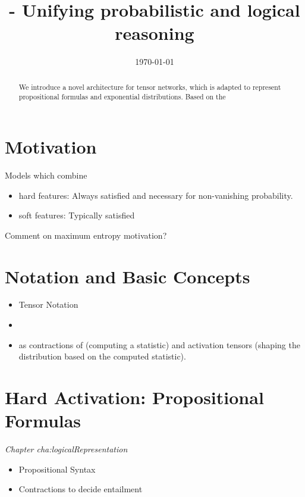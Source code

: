 \documentclass[aps,onecolumn,nofootinbib,pra]{article}
\renewcommand{\charef}[1]{\textit{Chapter #1}}
\begin{document}
    \title{\ComputationActivationNetworks{} - Unifying probabilistic and logical reasoning}

    \maketitle
    \date{\today}

    \begin{abstract}
        We introduce a novel architecture for tensor networks, which is adapted to represent propositional formulas and exponential distributions.
        Based on the
    \end{abstract}


    \section{Motivation}

    Models which combine
    \begin{itemize}
        \item hard features: Always satisfied and necessary for non-vanishing probability.
        \item soft features: Typically satisfied
    \end{itemize}

    Comment on maximum entropy motivation?


    \section{Notation and Basic Concepts}

    \begin{itemize}
        \item Tensor Notation
        \item \BasisEncodings{}
        \item \ComputationActivationNetworks{} as contractions of \BasisEncodings{} (computing a statistic) and activation tensors (shaping the distribution based on the computed statistic).
    \end{itemize}


    \section{Hard Activation: Propositional Formulas}

    \charef{cha:logicalRepresentation}
    \begin{itemize}
        \item Propositional Syntax
        \item Contractions to decide entailment
    \end{itemize}
\end{document}
